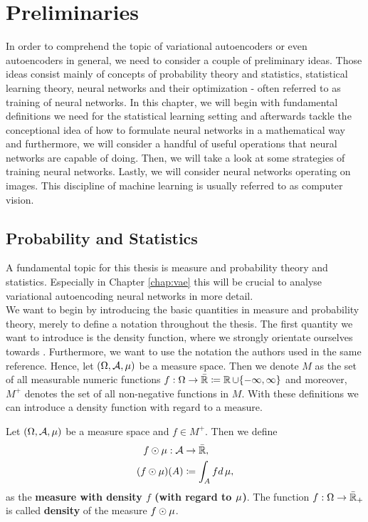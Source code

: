 \chapter{Preliminaries}\label{chap:preliminary}
In order to comprehend the topic of variational autoencoders or even autoencoders in general, we need to consider a couple of preliminary ideas. Those ideas consist mainly of concepts of probability theory and statistics, statistical learning theory, neural networks and their optimization - often referred to as training of neural networks. In this chapter, we will begin with fundamental definitions we need for the statistical learning setting and afterwards tackle the conceptional idea of how to formulate neural networks in a mathematical way and furthermore, we will consider a handful of useful operations that neural networks are capable of doing. Then, we will take a look at some strategies of training neural networks. Lastly, we will consider neural networks operating on images. This discipline of machine learning is usually referred to as computer vision.


\section{Probability and Statistics}\label{sec:preliminary_prob}
A fundamental topic for this thesis is measure and probability theory and statistics. Especially in Chapter \ref{chap:vae} this will be crucial to analyse variational autoencoding neural networks in more detail.\\
We want to begin by introducing the basic quantities in measure and probability theory, merely to define a notation throughout the thesis. The first quantity we want to introduce is the density function, where we strongly orientate ourselves towards \cite[Chapter~2 \& Chapter~3]{meintrup2006stochastik}. Furthermore, we want to use the notation the authors used in the same reference. Hence, let $(\Omega, \operatorname{\mathcal{A}}, \operatorname{\mu})$ be a measure space. Then we denote $M$ as the set of all measurable numeric functions $f:\Omega\to \bar{\operatorname{\mathbb{R}}}\coloneqq \operatorname{\mathbb{R}} \cup \{-\infty, \infty\}$ and moreover, $M^{+}$ denotes the set of all non-negative functions in $M$. With these definitions we can introduce a density function with regard to a measure.

\begin{definition}\label{def:density}
Let $(\Omega, \operatorname{\mathcal{A}}, \operatorname{\mu})$ be a measure space and $f\in M^{+}$. Then we define
\begin{align*}
f \odot \mu: \operatorname{\mathcal{A}} &\to \bar{\operatorname{\mathbb{R}}},\\
(f \odot \mu) (A) &\coloneqq \int_{A}fd\operatorname{\mu},
\end{align*}
as the \textbf{measure with density $f$ (with regard to $\operatorname{\mu}$)}. The function $f:\Omega \to \bar{\operatorname{\mathbb{R}}}_{+}$ is called \textbf{density} of the measure $f\odot \operatorname{\mu}$.
\end{definition}

